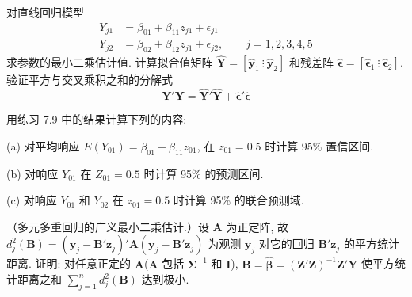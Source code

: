 对直线回归模型
\[
\begin{aligned}
Y_{j1}&=\beta_{01}+\beta_{11}z_{j1}+\epsilon_{j1}\\
Y_{j2}&=\beta_{02}+\beta_{12}z_{j1}+\epsilon_{j2},\qquad j=1,2,3,4,5
\end{aligned}
\]
求参数的最小二乘估计值. 计算拟合值矩阵 $\hat{\mathbf{Y}}=[\hat{\mathbf{y}}_1\ \vdots\ \hat{\mathbf{y}}_2]$ 和残差阵 $\hat{\boldsymbol{\epsilon}}=[\hat{\boldsymbol{\epsilon}}_1\ \vdots\ \hat{\boldsymbol{\epsilon}}_2]$. 验证平方与交叉乘积之和的分解式
\[
\mathbf{Y}'\mathbf{Y}=\hat{\mathbf{Y}}'\hat{\mathbf{Y}}+\hat{\boldsymbol{\epsilon}}'\hat{\boldsymbol{\epsilon}}
\]

\medskip
{}\quad 用练习 7.9 中的结果计算下列的内容:

\noindent (a) 对平均响应 $E(Y_{01})=\beta_{01}+\beta_{11}z_{01}$, 在 $z_{01}=0.5$ 时计算 95\% 置信区间.

\noindent (b) 对响应 $Y_{01}$ 在 $Z_{01}=0.5$ 时计算 95\% 的预测区间.

\noindent (c) 对响应 $Y_{01}$ 和 $Y_{02}$ 在 $z_{01}=0.5$ 时计算 95\% 的联合预测域.

\medskip
{}\quad （多元多重回归的广义最小二乘估计.）设 $\mathbf{A}$ 为正定阵, 故 $d_j^2(\mathbf{B})=(\mathbf{y}_j-\mathbf{B}'\mathbf{z}_j)'\mathbf{A}(\mathbf{y}_j-\mathbf{B}'\mathbf{z}_j)$ 为观测 $\mathbf{y}_j$ 对它的回归 $\mathbf{B}'\mathbf{z}_j$ 的平方统计距离. 证明: 对任意正定的 $\mathbf{A}$($\mathbf{A}$ 包括 $\boldsymbol{\Sigma}^{-1}$ 和 $\mathbf{I}$), $\mathbf{B}=\hat{\boldsymbol{\beta}}=(\mathbf{Z}'\mathbf{Z})^{-1}\mathbf{Z}'\mathbf{Y}$ 使平方统计距离之和 $\sum_{j=1}^{n}d_j^2(\mathbf{B})$ 达到极小.
